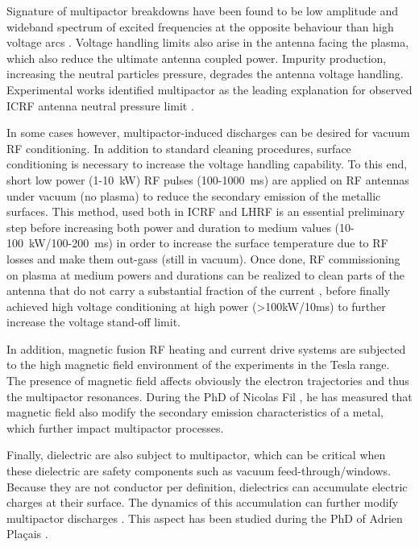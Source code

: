 
Signature of multipactor breakdowns have been found to be low amplitude and wideband spectrum of excited frequencies at the opposite behaviour than high voltage arcs \cite{dinca2009}. Voltage handling limits also arise in the antenna facing the plasma, which also reduce the ultimate antenna coupled power. Impurity production, increasing the neutral particles pressure, degrades the antenna voltage handling. Experimental works identified multipactor as the leading explanation for observed ICRF antenna neutral pressure limit .

In some cases however, multipactor-induced discharges can be desired for vacuum RF conditioning. In addition to standard cleaning procedures, surface conditioning is necessary to increase the voltage handling capability. To this end, short low power (1-10~kW) RF pulses (100-1000~ms) are applied on RF antennas under vacuum (no plasma) to reduce the secondary emission of the metallic surfaces. This method, used both in ICRF  and LHRF  is an essential preliminary step before increasing both power and duration to medium values (10-100~kW/100-200~ms) in order to increase the surface temperature due to RF losses and make them out-gass (still in vacuum). Once done, RF commissioning on plasma at medium powers and durations can be realized to clean parts of the antenna that do not carry a substantial fraction of the current , before finally achieved high voltage conditioning at high power (>100kW/10ms) to further increase the voltage stand-off limit.

In addition, magnetic fusion RF heating and current drive systems are subjected to the high magnetic field environment of the experiments in the Tesla range. The presence of magnetic field affects obviously the electron trajectories and thus the multipactor resonances. During the PhD of Nicolas Fil , he has measured that magnetic field also modify the secondary emission characteristics of a metal, which further impact multipactor processes. 

Finally, dielectric are also subject to multipactor, which can be critical when these dielectric are safety components such as vacuum feed-through/windows. Because they are not conductor per definition, dielectrics can accumulate electric charges at their surface. The dynamics of this accumulation can further modify multipactor discharges . This aspect has been studied during the PhD of Adrien Plaçais .


